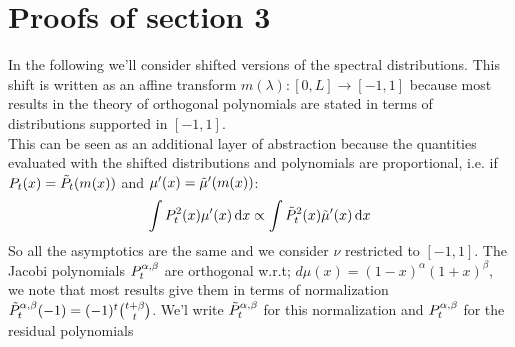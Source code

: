\documentclass{article}
\begin{document}
\section{Proofs of section 3}
In the following we'll consider shifted versions of the spectral distributions. This shift is written as an affine transform $m(\lambda):[0,L]\rightarrow [-1,1]$ because most results in the theory of orthogonal polynomials are stated in terms of distributions supported in $[-1,1]$. \\
This can be seen as an additional layer of abstraction because the quantities evaluated with the shifted distributions and polynomials are proportional, i.e. if $P_t(x)=\Tilde{P}_t(m(x))$ and $\mu'(x)=\Tilde{\mu}'(m(x))$:
\begin{equation}
    \int P_t^2(x)\mu'(x)\mathop{}\!\mathrm{d} x\propto \int \Tilde{P}_t^2(x)\Tilde{\mu}'(x)\mathop{}\!\mathrm{d} x
\end{equation}
So all the asymptotics are the same and we consider $\nu$ restricted to $[-1,1]$. 
The Jacobi polynomials $P^{\alpha,\beta}_t$ are orthogonal w.r.t; $d\mu(x)=(1-x)^\alpha(1+x)^\beta$, we note that most results give them in terms of normalization $\Tilde{P}_t^{\alpha,\beta}(-1)=(-1)^t\binom{t+\beta}{t}$. We'l write $\Tilde{P}^{\alpha,\beta}_t$ for this normalization and $P^{\alpha,\beta}_t$ for the residual polynomials
\robustjacobi*
\end{document}
